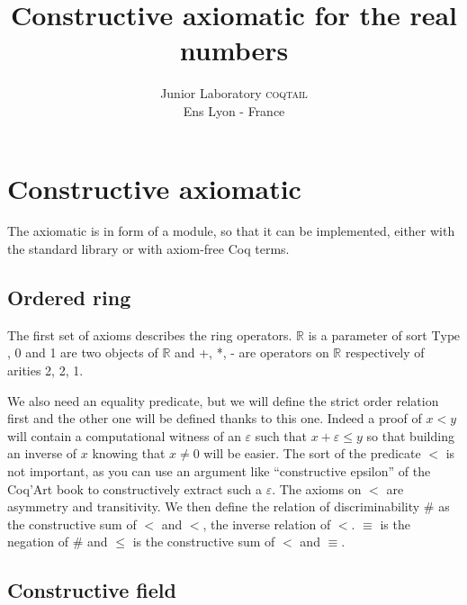 \documentclass[a4paper,11pt]{article}
\newcommand{\R}{\mathbb{R}}
\newcommand{\Type}{\mbox{Type}}
\newcommand{\coqtail}{\textsc{coqtail}}
\theoremstyle{definition}
\theoremstyle{remark}
\begin{document}
\title{Constructive axiomatic for the real numbers}
\author{Junior Laboratory \coqtail{}\\
Ens Lyon - France\\}

\maketitle 
{}

\section{Constructive axiomatic}

The axiomatic is in form of a module, so that it can be implemented, either with the standard library or with axiom-free Coq terms.

\subsection{Ordered ring}

The first set of axioms describes the ring operators. $\R$ is a parameter of sort $\Type$, 0 and 1 are two objects of $\R$ and +, *, - are operators on $\R$ respectively of arities 2, 2, 1.

We also need an equality predicate, but we will define the strict order relation first and the other one will be defined thanks to this one. Indeed a proof of $x<y$ will contain a computational witness of an $\varepsilon$ such that $x+\varepsilon≤y$ so that building an inverse of $x$ knowing that $x\neq 0$ will be easier. The sort of the predicate $<$ is not important, as you can use an argument like ``constructive epsilon'' of the Coq’Art book to constructively extract such a $\varepsilon$. The axioms on $<$ are asymmetry and transitivity. We then define the relation of discriminability $\#$ as the constructive sum of $<$ and $<$, the inverse relation of $<$. $≡$ is the negation of $\#$ and $≤$ is the constructive sum of $<$ and $≡$.


\subsection{Constructive field}
\end{document}
